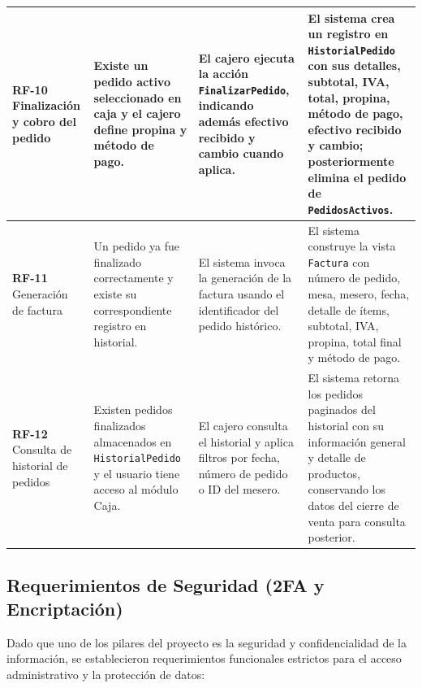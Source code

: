 \begin{longtable}{|p{2.4cm}|p{4cm}|p{4cm}|p{4.5cm}|}
	\textbf{RF-10} \newline Finalización y cobro del pedido
	&
	Existe un pedido activo seleccionado en caja y el cajero define propina y método de pago.
	&
	El cajero ejecuta la acción \texttt{FinalizarPedido}, indicando además efectivo recibido y cambio cuando aplica.
	&
	El sistema crea un registro en \texttt{HistorialPedido} con sus detalles, subtotal, IVA, total, propina, método de pago, efectivo recibido y cambio; posteriormente elimina el pedido de \texttt{PedidosActivos}.
	\\
	\hline
	
	\textbf{RF-11} \newline Generación de factura
	&
	Un pedido ya fue finalizado correctamente y existe su correspondiente registro en historial.
	&
	El sistema invoca la generación de la factura usando el identificador del pedido histórico.
	&
	El sistema construye la vista \texttt{Factura} con número de pedido, mesa, mesero, fecha, detalle de ítems, subtotal, IVA, propina, total final y método de pago.
	\\
	\hline
	
	\textbf{RF-12} \newline Consulta de historial de pedidos
	&
	Existen pedidos finalizados almacenados en \texttt{HistorialPedido} y el usuario tiene acceso al módulo Caja.
	&
	El cajero consulta el historial y aplica filtros por fecha, número de pedido o ID del mesero.
	&
	El sistema retorna los pedidos paginados del historial con su información general y detalle de productos, conservando los datos del cierre de venta para consulta posterior.
	\\
	\hline
	
\end{longtable}


\subsection{Requerimientos de Seguridad (2FA y Encriptación)}

Dado que uno de los pilares del proyecto es la seguridad y confidencialidad de la información, se establecieron requerimientos funcionales estrictos para el acceso administrativo y la protección de datos:

